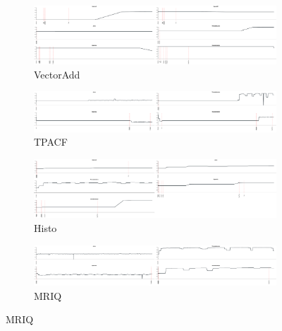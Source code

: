 \begin{figure}[ht]
  \centering
  \begin{subfigure}[b]{0.95\textwidth}
      \centering
      \includegraphics[width=\textwidth]{data/power_vectoradd_nexus7.pdf}
      \caption{VectorAdd}\label{fig:vectoradd}
  \end{subfigure}
  \begin{subfigure}[b]{0.95\textwidth}
      \centering
      \includegraphics[width=\textwidth]{data/power_tpacf_nexus7.pdf}
      \caption{TPACF}
      \label{fig:TPACF}
  \end{subfigure}

  \begin{subfigure}[b]{0.95\textwidth}
      \centering
      \includegraphics[width=\textwidth]{data/power_histogram_nexus7.pdf}
      \caption{Histo}\label{fig:histo}
  \end{subfigure}
  \begin{subfigure}[b]{0.95\textwidth}
      \centering
      \includegraphics[width=\textwidth]{data/power_mriq_nexus7.pdf}
      \caption{MRIQ}
      \label{fig:MRIQ}
  \end{subfigure}


\end{figure}
